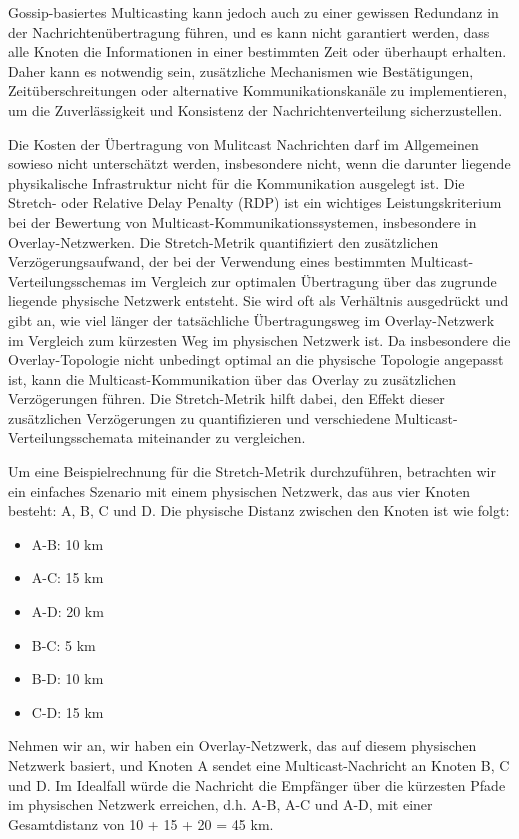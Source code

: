 Gossip-basiertes Multicasting kann jedoch auch zu einer gewissen Redundanz in der Nachrichtenübertragung führen, und es kann nicht garantiert werden, dass alle Knoten die Informationen in einer bestimmten Zeit oder überhaupt erhalten. Daher kann es notwendig sein, zusätzliche Mechanismen wie Bestätigungen, Zeitüberschreitungen oder alternative Kommunikationskanäle zu implementieren, um die Zuverlässigkeit und Konsistenz der Nachrichtenverteilung sicherzustellen.

Die Kosten der Übertragung von Mulitcast Nachrichten darf im Allgemeinen sowieso nicht unterschätzt werden, insbesondere nicht, wenn die darunter liegende physikalische Infrastruktur nicht für die Kommunikation ausgelegt ist. Die Stretch- oder Relative Delay Penalty (RDP) ist ein wichtiges Leistungskriterium bei der Bewertung von Multicast-Kommunikationssystemen, insbesondere in Overlay-Netzwerken. Die Stretch-Metrik quantifiziert den zusätzlichen Verzögerungsaufwand, der bei der Verwendung eines bestimmten Multicast-Verteilungsschemas im Vergleich zur optimalen Übertragung über das zugrunde liegende physische Netzwerk entsteht. Sie wird oft als Verhältnis ausgedrückt und gibt an, wie viel länger der tatsächliche Übertragungsweg im Overlay-Netzwerk im Vergleich zum kürzesten Weg im physischen Netzwerk ist. Da insbesondere die Overlay-Topologie nicht unbedingt optimal an die physische Topologie angepasst ist, kann die Multicast-Kommunikation über das Overlay zu zusätzlichen Verzögerungen führen. Die Stretch-Metrik hilft dabei, den Effekt dieser zusätzlichen Verzögerungen zu quantifizieren und verschiedene Multicast-Verteilungsschemata miteinander zu vergleichen.

Um eine Beispielrechnung für die Stretch-Metrik durchzuführen, betrachten wir ein einfaches Szenario mit einem physischen Netzwerk, das aus vier Knoten besteht: A, B, C und D. Die physische Distanz zwischen den Knoten ist wie folgt:
\begin{itemize} 
\item A-B: 10 km
\item A-C: 15 km
\item A-D: 20 km
\item B-C: 5 km
\item B-D: 10 km
\item C-D: 15 km
\end{itemize} 
Nehmen wir an, wir haben ein Overlay-Netzwerk, das auf diesem physischen Netzwerk basiert, und Knoten A sendet eine Multicast-Nachricht an Knoten B, C und D. Im Idealfall würde die Nachricht die Empfänger über die kürzesten Pfade im physischen Netzwerk erreichen, d.h. A-B, A-C und A-D, mit einer Gesamtdistanz von 10 + 15 + 20 = 45 km.

